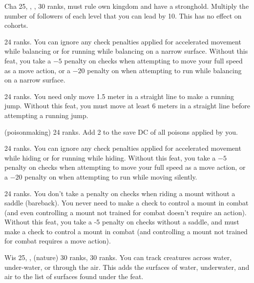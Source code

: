 {Cha 25, , ,  30 ranks, must rule own kingdom and have a stronghold.}
{Multiply the number of followers of each level that you can lead by 10. This has no effect on cohorts.}

{}
{ 24 ranks.}
{
  You can ignore any check penalties applied for accelerated movement while balancing or for running while balancing on a narrow surface.
}
{
  Without this feat, you take a $-5$ penalty on  checks when attempting to move your full speed as a move action, or a $-20$ penalty on  when attempting to run while balancing on a narrow surface.
}{}

{}
{ 24 ranks.}
{You need only move 1.5 meter in a straight line to make a running jump.}
{Without this feat, you must move at least 6 meters in a straight line before attempting a running jump.}{}

{ (poisonmaking) 24 ranks.}
{Add 2 to the save DC of all poisons applied by you.}

{}
{ 24 ranks.}
{
  You can ignore any check penalties applied for accelerated movement while hiding or for running while hiding.
}
{
  Without this feat, you take a $-5$ penalty on  checks when attempting to move your full speed as a move action, or a $-20$ penalty on  when attempting to run while moving silently.
}{}

{}
{ 24 ranks.}
{You don't take a penalty on  checks when riding a mount without a saddle (bareback). You never need to make a  check to control a mount in combat (and even controlling a mount not trained for combat doesn't require an action).}
{Without this feat, you take a -5 penalty on  checks without a saddle, and must make a  check to control a mount in combat (and controlling a mount not trained for combat requires a move action).}{}

{Wis 25, ,  (nature) 30 ranks,  30 ranks.}
{You can track creatures across water, under-water, or through the air. This adds the surfaces of water, underwater, and air to the list of surfaces found under the  feat.}



